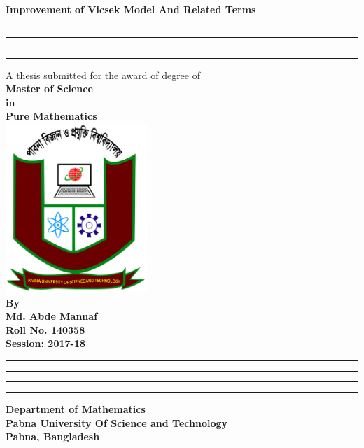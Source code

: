 \thispagestyle{empty}
\begin{center}
\textbf{\Large Improvement of Vicsek Model And Related Terms}
\vspace{1cm}
\hrule\hrule\hrule\hrule
\vspace{1cm}
A thesis submitted for the award of degree of\\\vspace{0.5cm}
 \textbf{Master of Science\\
in\\
Pure Mathematics\\
\vspace{1cm} 
\includegraphics[width=0.4\textwidth]{Images/pust_logo.jpg}\\
\vspace{2cm}
By\\
Md. Abde Mannaf\\
Roll No. 140358\\
Session: 2017-18}
\vspace{1.5cm}
\hrule\hrule\hrule\hrule
\textbf{      
Department of Mathematics\\
Pabna University Of Science and Technology\\
Pabna, Bangladesh}
\end{center}
\clearpage

